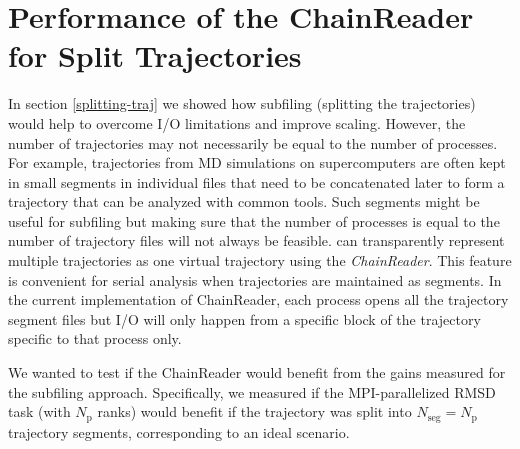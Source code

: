 
\section{Performance of the ChainReader for Split Trajectories}
\label{sec:chainreader}

In section \ref{splitting-traj} we showed how subfiling (splitting the trajectories) would help to overcome I/O limitations and improve scaling. 
However, the number of trajectories may not necessarily be equal to the number of processes.
For example, trajectories from MD simulations on supercomputers are often kept in small segments in individual files that need to be concatenated later to form a trajectory that can be analyzed with common tools.
Such segments might be useful for subfiling but making sure that the number of processes is equal to the number of trajectory files will not always be feasible. 
 can transparently represent multiple trajectories as one virtual trajectory using the \emph{ChainReader}.
This feature is  convenient for serial analysis when trajectories are maintained as segments.
In the current implementation of ChainReader, each process opens all the trajectory segment files but I/O will only happen from a specific block of the trajectory specific to that process only.

We wanted to test if the ChainReader would benefit from the gains measured for the subfiling approach.
Specifically, we measured if the MPI-parallelized RMSD task (with $N_{\text{p}}$ ranks) would benefit if the trajectory was split into $N_{\text{seg}} = N_{\text{p}}$ trajectory segments, corresponding to an ideal scenario.
 
